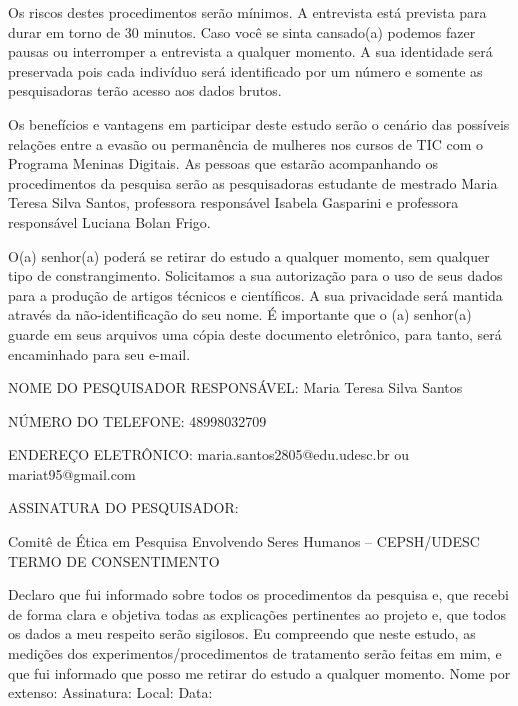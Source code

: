 \begin{apendicesenv}
Os riscos destes procedimentos serão mínimos. A entrevista está prevista para durar em torno de 30 minutos. Caso você se sinta cansado(a) podemos fazer pausas ou interromper a entrevista a qualquer momento. A sua identidade será preservada pois cada indivíduo será identificado por um número e somente as pesquisadoras terão acesso aos dados brutos.

Os benefícios e vantagens em participar deste estudo serão o cenário das possíveis relações entre a evasão ou permanência de mulheres nos cursos de TIC com o Programa Meninas Digitais.
As pessoas que estarão acompanhando os procedimentos da pesquisa serão as pesquisadoras estudante de mestrado Maria Teresa Silva Santos, professora responsável Isabela Gasparini e professora responsável Luciana Bolan Frigo.

O(a) senhor(a) poderá se retirar do estudo a qualquer momento, sem qualquer tipo de constrangimento.
Solicitamos a sua autorização para o uso de seus dados para a produção de artigos técnicos e científicos. A sua privacidade será mantida através da não-identificação do seu nome.
É importante que o (a) senhor(a) guarde em seus arquivos uma cópia deste documento eletrônico, para tanto, será encaminhado para seu e-mail.
\newline 
\newline 

NOME DO PESQUISADOR RESPONSÁVEL:  Maria Teresa Silva Santos

NÚMERO DO TELEFONE: 48998032709	

ENDEREÇO ELETRÔNICO: maria.santos2805@edu.udesc.br ou mariat95@gmail.com	

ASSINATURA DO PESQUISADOR: 
\newline 
\newline 

\newline 
\begin{center}
Comitê de Ética em Pesquisa Envolvendo Seres Humanos – CEPSH/UDESC
    TERMO DE CONSENTIMENTO
\end{center} 

Declaro que fui informado sobre todos os procedimentos da pesquisa e, que recebi de forma clara e objetiva todas as explicações pertinentes ao projeto e, que todos os dados a meu respeito serão sigilosos. Eu compreendo que neste estudo, as medições dos experimentos/procedimentos de tratamento serão feitas em mim, e que fui informado que posso me retirar do estudo a qualquer momento.
\newline 
\newline 
Nome por extenso: 
\newline 
Assinatura: 
\newline 
Local: 
\newline 
Data: 
\newline 
\newline 




\end{apendicesenv}
